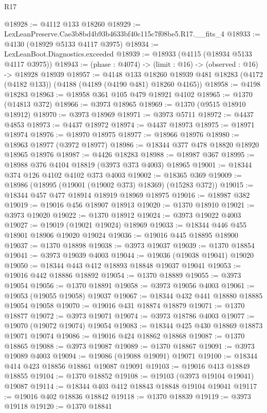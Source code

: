 \begin{lexlean}{R17}
\begin{coremodule}
@18928 := @4112 @133 @18260
@18929 := LexLeanPreserve.Cae3b8bd4b93b4633bf40c115c7f08be5.R17.__fits_4
@18933 := @4130 (@18929 @5133 @4117 @3975)
@18934 := LexLeanBoot.Diagnostics.exceeded
@18939 := @18933 (@4115 (@18934 @5133 @4117 @3975))
@18943 := (phase : @4074) -> (limit : @16) -> (observed : @16) -> @18928 @18939
@18957 := @4148
    @133
    @18260
    @18939
    @481
    @18283
    (@4172 (@4182 @133))
    (@4188 (@4189 (@4190 @481) @18260 @4165))
@18958 := @4198 @18283
@18963 := @18958 @361 @105 @479 @18921 @4102
@18965 := @1370 (@14813 @372)
@18966 := @3973 @18965
@18969 := @1370 (@9515 @18910 @18912)
@18970 := @3973 @18969
@18971 := @3973 @5711
@18972 := @4437 @4853
@18973 := @4437 @18972
@18974 := @4437 @18973
@18975 := @18971 @18974
@18976 := @18970 @18975
@18977 := @18966 @18976
@18980 := @18963 @18977 (@3972 @18977)
@18986 := @18344 @377 @478 @18820 @18920 @18965 @18976
@18987 := @4426 @18283
@18988 := @18987 @367
@18995 := @18988 @376 @4104 @18819 (@3973 @373 @4003) @18965
@19001 := @18344 @374 @126 @4102 @4102 @373 @4003
@19002 := @18365 @369
@19009 := @18986 (@18995 (@19001 (@19002 @373) @18369) (@15283 @372))
@19015 := @18344 @457 @477 @18914 @18919 @18969 @18975
@19016 := @18987 @382
@19019 := @19016 @456 @18907 @18913
@19020 := @1370 @18910
@19021 := @3973 @19020
@19022 := @1370 @18912
@19024 := @3973 @19022 @4003
@19027 := @19019 (@19021 @19024) @18969
@19033 := @18344 @446 @455 @18901 @18906 @19020 @19024
@19036 := @19016 @445 @18895 @18900
@19037 := @1370 @18898
@19038 := @3973 @19037
@19039 := @1370 @18854
@19041 := @3973 @19039 @4003
@19044 := @19036 (@19038 @19041) @19020
@19050 := @18344 @443 @412 @18893 @18848 @19037 @19041
@19053 := @19016 @442 @18886 @18892
@19054 := @1370 @18889
@19055 := @3973 @19054
@19056 := @1370 @18891
@19058 := @3973 @19056 @4003
@19061 := @19053 (@19055 @19058) @19037
@19067 := @18344 @432 @441 @18880 @18885 @19054 @19058
@19070 := @19016 @431 @18874 @18879
@19071 := @1370 @18877
@19072 := @3973 @19071
@19074 := @3973 @18786 @4003
@19077 := @19070 (@19072 @19074) @19054
@19083 := @18344 @425 @430 @18869 @18873 @19071 @19074
@19086 := @19016 @424 @18862 @18868
@19087 := @1370 @18865
@19088 := @3973 @19087
@19089 := @1370 @18867
@19091 := @3973 @19089 @4003
@19094 := @19086 (@19088 @19091) @19071
@19100 := @18344 @414 @423 @18856 @18861 @19087 @19091
@19103 := @19016 @413 @18849 @18855
@19104 := @1370 @18852
@19108 := @19103 (@3973 @19104 @19041) @19087
@19114 := @18344 @403 @412 @18843 @18848 @19104 @19041
@19117 := @19016 @402 @18836 @18842
@19118 := @1370 @18839
@19119 := @3973 @19118
@19120 := @1370 @18841

\end{coremodule}
\end{lexlean}
